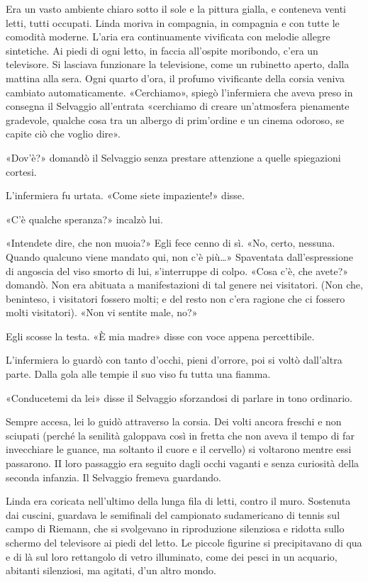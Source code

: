 \documentclass[
a5paper, %
10pt, %
twoside, 
onecolumn, %
openany, %
]{memoir}
\begin{document}
Era un vasto ambiente chiaro sotto il sole e la pittura gialla, e conteneva venti letti, tutti occupati. Linda moriva in compagnia, in compagnia e con tutte le comodità moderne. L’aria era continuamente vivificata con melodie allegre sintetiche. Ai piedi di ogni letto, in faccia all’ospite moribondo, c’era un televisore. Si lasciava funzionare la televisione, come un rubinetto aperto, dalla mattina alla sera. Ogni quarto d’ora, il profumo vivificante della corsia veniva cambiato automaticamente. «Cerchiamo», spiegò l’infermiera che aveva preso in consegna il Selvaggio all’entrata «cerchiamo di creare un’atmosfera pienamente gradevole, qualche cosa tra un albergo di prim’ordine e un cinema odoroso, se capite ciò che voglio dire».

«Dov’è?» domandò il Selvaggio senza prestare attenzione a quelle spiegazioni cortesi.

L’infermiera fu urtata. «Come siete impaziente!» disse.

«C’è qualche speranza?» incalzò lui.

«Intendete dire, che non muoia?» Egli fece cenno di sì. «No, certo, nessuna. Quando qualcuno viene mandato qui, non c’è più…» Spaventata dall’espressione di angoscia del viso smorto di lui, s’interruppe di colpo. «Cosa c’è, che avete?» domandò. Non era abituata a manifestazioni di tal genere nei visitatori. (Non che, beninteso, i visitatori fossero molti; e del resto non c’era ragione che ci fossero molti visitatori). «Non vi sentite male, no?»

Egli scosse la testa. «È mia madre» disse con voce appena percettibile.

L’infermiera lo guardò con tanto d’occhi, pieni d’orrore, poi si voltò dall’altra parte. Dalla gola alle tempie il suo viso fu tutta una fiamma.

«Conducetemi da lei» disse il Selvaggio sforzandosi di parlare in tono ordinario.

Sempre accesa, lei lo guidò attraverso la corsia. Dei volti ancora freschi e non sciupati (perché la senilità galoppava così in fretta che non aveva il tempo di far invecchiare le guance, ma soltanto il cuore e il cervello) si voltarono mentre essi passarono. II loro passaggio era seguito dagli occhi vaganti e senza curiosità della seconda infanzia. Il Selvaggio fremeva guardando.

Linda era coricata nell’ultimo della lunga fila di letti, contro il muro. Sostenuta dai cuscini, guardava le semifinali del campionato sudamericano di tennis sul campo di Riemann, che si svolgevano in riproduzione silenziosa e ridotta sullo schermo del televisore ai piedi del letto. Le piccole figurine si precipitavano di qua e di là sul loro rettangolo di vetro illuminato, come dei pesci in un acquario, abitanti silenziosi, ma agitati, d’un altro mondo.
\end{document}
